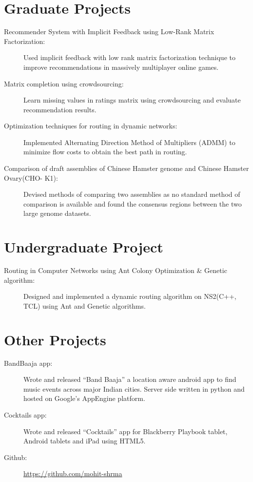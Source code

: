 \documentclass[a4paper,10pt]{article}
\begin{document}
\section{Graduate Projects}
\begin{description}
  \item[Recommender System with Implicit Feedback using Low-Rank Matrix
    Factorization:] Used implicit feedback with low rank matrix factorization
    technique to improve recommendations in massively multiplayer online games.
  \item[Matrix completion using crowdsourcing:] Learn missing values
    in ratings matrix using crowdsourcing  and evaluate recommendation results.
  \item[Optimization techniques for routing in dynamic networks:] Implemented
    Alternating Direction Method of Multipliers (ADMM) to minimize flow costs to obtain
    the best path in routing.
  \item[Comparison of draft assemblies of Chinese Hamster genome and Chinese
    Hamster Ovary(CHO- K1):] Devised methods of comparing two assemblies as no
    standard method of comparison is available and found the consensus regions
    between the two large genome datasets.
\end{description}

\section{Undergraduate Project}
\begin{description}
  \item[Routing in Computer Networks using Ant Colony Optimization \& Genetic algorithm:] Designed and implemented a dynamic routing algorithm on NS2(C++,
  TCL) using Ant and Genetic algorithms.  
\end{description}

\section{Other Projects}
\begin{description}
  \item[BandBaaja app:] Wrote and released “Band Baaja” a location
    aware android app to find music events across major Indian cities. Server
    side written in python and hosted on Google’s AppEngine platform. 
  \item[Cocktails app:] Wrote and released “Cocktails” app for Blackberry
    Playbook tablet, Android tablets and iPad using HTML5.
  \item[Github:] \url{https://github.com/mohit-shrma}  
\end{description}



\end{document}
